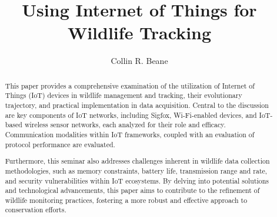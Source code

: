 \documentclass[sigplan,screen,nonacm]{acmart}
\begin{document}
\title{Using Internet of Things for Wildlife Tracking}

\author{Collin R. Beane}

\begin{abstract}
  This paper provides a comprehensive examination of the utilization of
  Internet of Things (IoT) devices in wildlife management and tracking,
  their evolutionary trajectory, and practical implementation in data
  acquisition. Central to the discussion are key components of IoT networks,
  including Sigfox, Wi-Fi-enabled devices, and IoT-based wireless sensor
  networks, each analyzed for their role and efficacy. Communication
  modalities within IoT frameworks, coupled with an evaluation of protocol
  performance are evaluated.

  Furthermore, this seminar also addresses challenges inherent in wildlife
  data collection methodologies, such as memory constraints, battery life,
  transmission range and rate, and security vulnerabilities within IoT
  ecosystems. By delving into potential solutions and technological
  advancements, this paper aims to contribute to the refinement of wildlife
  monitoring practices, fostering a more robust and effective approach to
  conservation efforts.
\end{abstract}

\doclicenseThis



\maketitle
\end{document}
